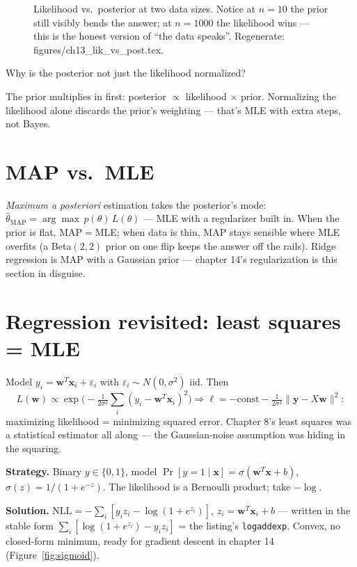 \begin{figure}[htbp]
\centering

\caption{Likelihood vs.\ posterior at two data sizes. Notice at $n=10$
the prior still visibly bends the answer; at $n=1000$ the likelihood
wins --- this is the honest version of ``the data speaks''.
Regenerate: \ttfamily figures/ch13\_lik\_vs\_post.tex.}
\label{fig:likpost}
\end{figure}

\begin{exercise}[medium]
Why is the posterior not just the likelihood normalized?
\begin{solution}
The prior multiplies in first: posterior $\propto$ likelihood $\times$
prior. Normalizing the likelihood alone discards the prior's weighting
--- that's MLE with extra steps, not Bayes.
\end{solution}
\end{exercise}

\section{MAP vs.\ MLE}\label{sec:stats-map}

\emph{Maximum a posteriori} estimation takes the posterior's
mode: $\hat\theta_{\mathrm{MAP}}=\arg\max\,p(\theta)\,L(\theta)$ ---
MLE with a regularizer built in. When the prior is flat, MAP$=$MLE; when
data is thin, MAP stays sensible where MLE overfits (a Beta$(2,2)$ prior
on one flip keeps the answer off the rails). Ridge regression is MAP
with a Gaussian prior --- chapter 14's regularization is this section in
disguise.

\section{Regression revisited: least squares = MLE}\label{sec:stats-ls}

Model $y_i=\mathbf w^{T}\mathbf x_i+\varepsilon_i$ with
$\varepsilon_i\sim N(0,\sigma^{2})$ iid. Then
\[
L(\mathbf w)\propto\exp\!\Big(-\tfrac{1}{2\sigma^{2}}
\sum_i(y_i-\mathbf w^{T}\mathbf x_i)^{2}\Big)
\Rightarrow \ell=-\mathrm{const}-\tfrac{1}{2\sigma^{2}}\lVert\mathbf
y-X\mathbf w\rVert^{2}:
\]
maximizing likelihood = minimizing squared error. Chapter 8's least
squares was a statistical estimator all along --- the Gaussian-noise
assumption was hiding in the squaring.

\begin{example}\label{ex:logitnll}
\textbf{Strategy.} Binary $y\in\{0,1\}$, model
$\Pr[y=1\mid\mathbf x]=\sigma(\mathbf w^{T}\mathbf x+b)$,
$\sigma(z)=1/(1+e^{-z})$. The likelihood is a Bernoulli product; take
$-\log$.

\textbf{Solution.}
$\mathrm{NLL}=-\sum_i[y_i z_i-\log(1+e^{z_i})]$,
$z_i=\mathbf w^{T}\mathbf x_i+b$ --- written in the stable form
$\sum_i[\log(1+e^{z_i})-y_i z_i]$ = the listing's
\texttt{logaddexp}. Convex, no closed-form minimum, ready for
gradient descent in chapter 14 (Figure~\ref{fig:sigmoid}).
\end{example}

